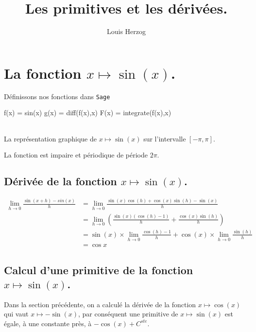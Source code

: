 \documentclass[a4paper,12pt]{report}
\newcommand{\sommaire}{\shorttoc{Sommaire}{1}}
\begin{document}
 


\setlength{\parindent}{0pt}



\title{Les primitives et les dérivées.}


\author{Louis Herzog} 

\maketitle 

\setcounter{tocdepth}{2}
\tableofcontents


\section{La fonction  $x \mapsto \sin(x)$.}
Définissons nos fonctions dans {\texttt{Sage}}
\begin{sageblock}
    f(x) = sin(x)
    g(x) = diff(f(x),x)
    F(x) = integrate(f(x),x)
\end{sageblock}


\begin{center}
 \\
La représentation graphique de $x\mapsto \sin(x)$ sur l'intervalle $[-\pi, \pi]$.
\end{center}
La fonction est impaire et périodique de période $2 \pi$.

\subsection{Dérivée de la fonction $x \mapsto \sin(x)$.}
\begin{align*}
\lim_{h\to 0} \frac{\sin(x+h)-sin(x)}{h} 
& = \lim_{h\to 0} \frac{\sin(x)\cos(h)+\cos(x)\sin(h)-\sin(x)}{h} \\  
& =  \lim_{h\to 0} \left( \frac{\sin(x)(\cos(h)-1)}{h}+\frac{\cos(x)\sin(h)}{h} \right) \\ 
& = \sin(x) \times  \lim_{h\to 0} \frac{\cos(h)-1}{h}+\cos(x) \times  \lim_{h\to 0}  \frac{\sin(h)}{h} \\ 
& = \cos{x}
\end{align*}

\subsection{Calcul d'une primitive de la fonction  $x \mapsto \sin(x)$.}
Dans la section précédente, on a calculé la dérivée de la fonction $x \mapsto \cos(x)$ qui vaut $x \mapsto -\sin(x)$, par conséquent une primitive de $x \mapsto \sin(x)$ est égale, à une constante près, à $ - \cos(x) + C^{ste} $.
\end{document}
